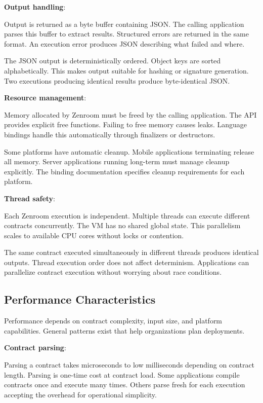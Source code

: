 \textbf{Output handling}:

Output is returned as a byte buffer containing JSON. The calling
application parses this buffer to extract results. Structured errors
are returned in the same format. An execution error produces JSON
describing what failed and where.

The JSON output is deterministically ordered. Object keys are sorted
alphabetically. This makes output suitable for hashing or signature
generation. Two executions producing identical results produce
byte-identical JSON.

\textbf{Resource management}:

Memory allocated by Zenroom must be freed by the calling
application. The API provides explicit free functions. Failing to free
memory causes leaks. Language bindings handle this automatically
through finalizers or destructors.

Some platforms have automatic cleanup. Mobile applications terminating
release all memory. Server applications running long-term must manage
cleanup explicitly. The binding documentation specifies cleanup
requirements for each platform.

\textbf{Thread safety}:

Each Zenroom execution is independent. Multiple threads can execute
different contracts concurrently. The VM has no shared global
state. This parallelism scales to available CPU cores without locks or
contention.

The same contract executed simultaneously in different threads
produces identical outputs. Thread execution order does not affect
determinism. Applications can parallelize contract execution without
worrying about race conditions.

\subsection{Performance Characteristics}

Performance depends on contract complexity, input size, and platform
capabilities. General patterns exist that help organizations plan
deployments.

\textbf{Contract parsing}:

Parsing a contract takes microseconds to low milliseconds depending on
contract length. Parsing is one-time cost at contract load. Some
applications compile contracts once and execute many times. Others
parse fresh for each execution accepting the overhead for operational
simplicity.

